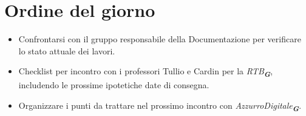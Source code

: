 

\section{Ordine del giorno}

\begin{itemize}
    \item Confrontarsi con il gruppo responsabile della Documentazione per verificare lo stato attuale dei lavori.
    \item Checklist per incontro con i professori Tullio e Cardin per la \emph{RTB}\textsubscript{\textit{\textbf{G}}}, includendo le prossime ipotetiche date di consegna.
    \item Organizzare i punti da trattare nel prossimo incontro con \emph{AzzurroDigitale}\textsubscript{\textit{\textbf{G}}}.
\end{itemize}